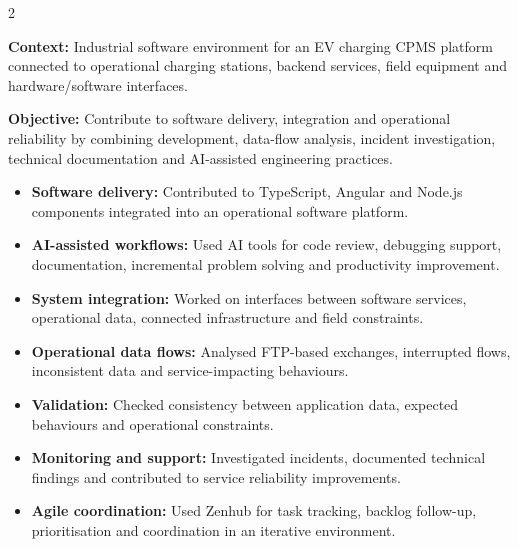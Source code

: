 \documentclass[8pt,a4paper,ragged2e,withhyper]{../_shared/altacv}
\begin{document}



\makecvheader
\vspace{-0.3cm}


\begin{paracol}{2}



\textbf{Context:} Industrial software environment for an EV charging CPMS platform connected to operational charging stations, backend services, field equipment and hardware/software interfaces.

\textbf{Objective:} Contribute to software delivery, integration and operational reliability by combining development, data-flow analysis, incident investigation, technical documentation and AI-assisted engineering practices.

\begin{itemize}
  \item \textbf{Software delivery:} Contributed to TypeScript, Angular and Node.js components integrated into an operational software platform.
  \item \textbf{AI-assisted workflows:} Used AI tools for code review, debugging support, documentation, incremental problem solving and productivity improvement.
  \item \textbf{System integration:} Worked on interfaces between software services, operational data, connected infrastructure and field constraints.
  \item \textbf{Operational data flows:} Analysed FTP-based exchanges, interrupted flows, inconsistent data and service-impacting behaviours.
  \item \textbf{Validation:} Checked consistency between application data, expected behaviours and operational constraints.
  \item \textbf{Monitoring and support:} Investigated incidents, documented technical findings and contributed to service reliability improvements.
  \item \textbf{Agile coordination:} Used Zenhub for task tracking, backlog follow-up, prioritisation and coordination in an iterative environment.
\end{itemize}


\end{paracol}
\end{document}
